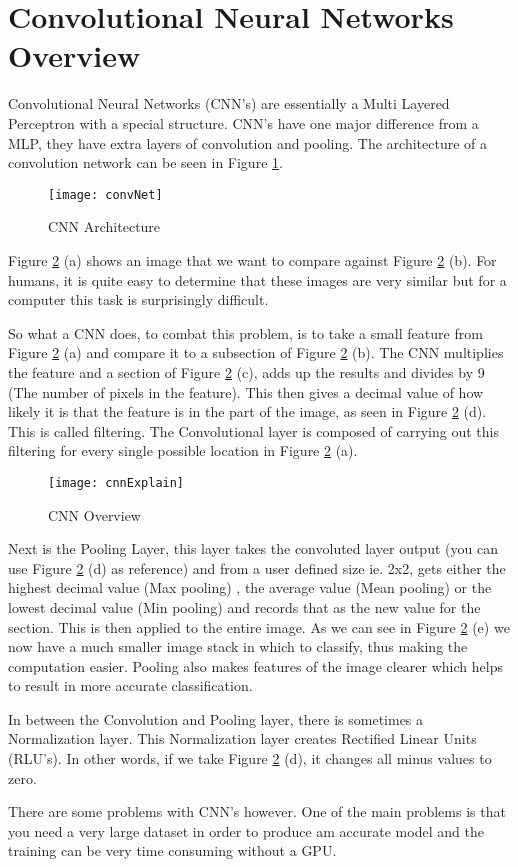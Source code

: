 \section{Convolutional Neural Networks Overview}
Convolutional Neural Networks (CNN's) are essentially a Multi Layered Perceptron with a
special structure. CNN's have one major difference from a MLP, they have extra
layers of convolution and pooling. The architecture of a convolution network can
be seen in Figure \ref{fig:convNet}.

\begin{figure}[h]
	\texttt{[image: convNet]}
	\caption{CNN Architecture}
	\label{fig:convNet}
\end{figure}

Figure \ref{fig:cnnExplain} (a) shows an image that we want to compare against
Figure \ref{fig:cnnExplain} (b).
For humans, it is quite easy to determine that these images are very similar but
for a computer this task is surprisingly difficult.

So what a CNN does, to combat this problem, is to take a small feature from
Figure \ref{fig:cnnExplain} (a) and compare it to a subsection of Figure \ref{fig:cnnExplain} (b).
The CNN multiplies the feature and a section of Figure \ref{fig:cnnExplain} (c), adds
up the results and divides by 9 (The number of pixels in the feature). This then gives a decimal value of how likely
it is that the feature is in the part of the image, as seen in Figure
\ref{fig:cnnExplain} (d).
This is called filtering. The Convolutional layer is composed of carrying out
this filtering for every single possible location in Figure \ref{fig:cnnExplain} (a).

\begin{figure}
    \texttt{[image: cnnExplain]}
    \caption{CNN Overview}
    \label{fig:cnnExplain}
\end{figure}
Next is the Pooling Layer, this layer takes the convoluted
layer output (you can use Figure \ref{fig:cnnExplain} (d) as reference) and from a
user defined size ie. 2x2, gets either the highest decimal value (Max pooling)
, the average value (Mean pooling) or the lowest decimal value (Min pooling) and records that as the new value for the
section. This is then applied to the entire image. As we can see in Figure
\ref{fig:cnnExplain} (e) we now have a much smaller image stack in which to classify,
thus making the computation easier. Pooling also makes features of the image clearer which helps to result in more accurate classification.

In between the Convolution and Pooling layer, there is sometimes a Normalization
layer. This Normalization layer creates Rectified Linear Units (RLU's). In other
words, if we take Figure \ref{fig:cnnExplain} (d), it changes all minus values to
zero.

There are some problems with CNN's however. One of the main problems is that you
need a very large dataset in order to produce am accurate model and the training
can be very time consuming without a GPU.